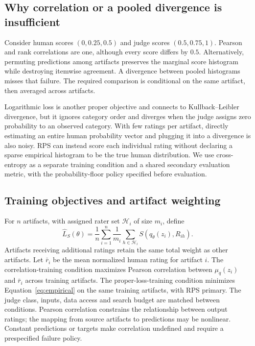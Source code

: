 \subsection{Why correlation or a pooled divergence is insufficient}
Consider human scores $(0,0.25,0.5)$ and judge scores $(0.5,0.75,1)$.
Pearson and rank correlations are one, although every score differs by $0.5$.
Alternatively, permuting predictions among artifacts preserves the marginal score histogram while destroying itemwise agreement.
A divergence between pooled histograms misses that failure.
The required comparison is conditional on the same artifact, then averaged across artifacts.

Logarithmic loss is another proper objective and connects to Kullback--Leibler divergence, but it ignores category order and diverges when the judge assigns zero probability to an observed category.
With few ratings per artifact, directly estimating an entire human probability vector and plugging it into a divergence is also noisy.
RPS can instead score each individual rating without declaring a sparse empirical histogram to be the true human distribution.
We use cross-entropy as a separate training condition and a shared secondary evaluation metric, with the probability-floor policy specified before evaluation.

\subsection{Training objectives and artifact weighting}
For $n$ artifacts, with assigned rater set $\mathcal H_i$ of size $m_i$, define
\begin{equation}
 \widehat L_S(\theta)=\frac1n\sum_{i=1}^{n}
       \frac1{m_i}\sum_{h\in\mathcal H_i}S(q_\theta(z_i),R_{ih}).
 \label{eq:empirical}
\end{equation}
Artifacts receiving additional ratings retain the same total weight as other artifacts.
Let $\bar r_i$ be the mean normalized human rating for artifact $i$.
The correlation-training condition maximizes Pearson correlation between $\mu_q(z_i)$ and $\bar r_i$ across training artifacts.
The proper-loss-training condition minimizes Equation~\ref{eq:empirical} on the same training artifacts, with RPS primary.
The judge class, inputs, data access and search budget are matched between conditions.
Pearson correlation constrains the relationship between output ratings; the mapping from source artifacts to predictions may be nonlinear.
Constant predictions or targets make correlation undefined and require a prespecified failure policy.

